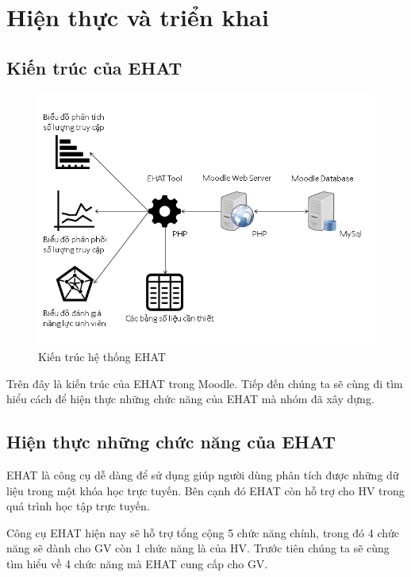 \setcounter{chapter}{3}
\chapter{Hiện thực và triển khai}

\section{Kiến trúc của EHAT}

\begin{center}
	\begin{figure}[htp]
		\begin{center}
			\includegraphics[scale=1]{img/kientrucehat}
		\end{center}
		\caption{Kiến trúc hệ thống EHAT}
		\label{refhinh21}
	\end{figure}
\end{center}

Trên đây là kiến trúc của EHAT trong Moodle. Tiếp đến chúng ta sẽ cùng đi tìm hiểu cách để hiện thực những chức năng của EHAT mà nhóm đã xây dựng.

\section{Hiện thực những chức năng của EHAT}

EHAT là công cụ dễ dàng để sử dụng giúp người dùng phân tích được những dữ liệu trong một khóa học trực tuyến. Bên cạnh đó EHAT còn hỗ trợ cho HV trong quá trình học tập trực tuyến.

Công cụ EHAT hiện nay sẽ hỗ trợ tổng cộng 5 chức năng chính, trong đó 4 chức năng sẽ dành cho GV còn 1 chức năng là của HV. Trước tiên chúng ta sẽ cùng tìm hiểu về 4 chức năng mà EHAT cung cấp cho GV.

